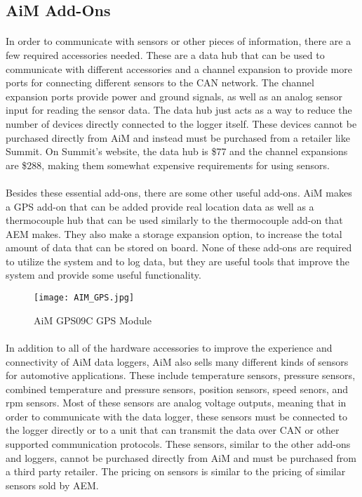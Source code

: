 \subsection{AiM Add-Ons}

\paragraph{}
In order to communicate with sensors or other pieces of information, there are a few required accessories needed.
These are a data hub that can be used to communicate with different accessories and a channel expansion to provide more ports for connecting different sensors to the CAN network.
The channel expansion ports provide power and ground signals, as well as an analog sensor input for reading the sensor data.
The data hub just acts as a way to reduce the number of devices directly connected to the logger itself.
These devices cannot be purchased directly from AiM and instead must be purchased from a retailer like Summit.
On Summit's website, the data hub is \$77 and the channel expansions are \$288, making them somewhat expensive requirements for using sensors.

\paragraph{}
Besides these essential add-ons, there are some other useful add-ons.
AiM makes a GPS add-on that can be added provide real location data as well as a thermocouple hub that can be used similarly to the thermocouple add-on that AEM makes.
They also make a storage expansion option, to increase the total amount of data that can be stored on board.
None of these add-ons are required to utilize the system and to log data, but they are useful tools that improve the system and provide some useful functionality.

\begin{figure}[H]
	\centering
	\texttt{[image: AIM\_GPS.jpg]}
	\caption{AiM GPS09C GPS Module}
	\label{fig:AIM_GPS}
\end{figure}

\paragraph{}
In addition to all of the hardware accessories to improve the experience and connectivity of AiM data loggers, AiM also sells many different kinds of sensors for automotive applications.
These include temperature sensors, pressure sensors, combined temperature and pressure sensors, position sensors, speed senors, and rpm sensors.
Most of these sensors are analog voltage outputs, meaning that in order to communicate with the data logger, these sensors must be connected to the logger directly or to a unit that can transmit the data over CAN or other supported communication protocols.
These sensors, similar to the other add-ons and loggers, cannot be purchased directly from AiM and must be purchased from a third party retailer.
The pricing on sensors is similar to the pricing of similar sensors sold by AEM.

